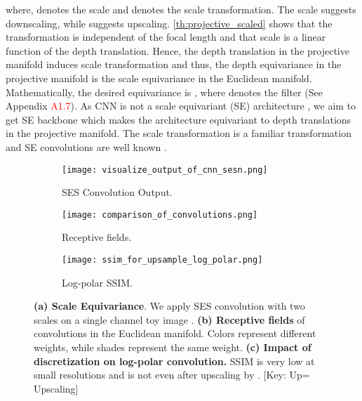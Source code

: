 \documentclass[runningheads]{llncs}
\newcommand{\equivariant} {equivariant}
\newcommand{\equivariance}{equivariance}
\newcommand{\Equivariance}{Equivariance}
\newcommand{\scaleEquivariant} {scale \equivariant}
\newcommand{\scaleEquivariance}{scale \equivariance}
\newcommand{\ScaleEquivariance}{Scale \Equivariance}
\newcommand{\ses}{SES}
\newcommand{\se}{SE}
\newcommand{\manifold}{manifold}
\newcommand{\transformation}{transformation}
\newcommand{\logPolar}{log-polar}
\newcommand{\LogPolar}{Log-polar}
\newcommand{\refSupApp}[1]{Appendix \textcolor{red}{A#1}}
\begin{document}
        where,  denotes the scale and  denotes the scale \transformation. 
        The scale  suggests downscaling, while  suggests upscaling.
        \cref{th:projective_scaled} shows that the \transformation{}   is independent of the focal length and that scale is a linear function of the depth translation.
        Hence, the depth translation in the projective \manifold{} induces scale \transformation{} and thus, the depth \equivariance{} in the projective manifold is the \scaleEquivariance{} in the Euclidean manifold. 
        Mathematically, the desired \equivariance{} is , where  denotes the filter (See \refSupApp{1.7}). As CNN is not a \scaleEquivariant{} (\se) architecture \cite{sosnovik2020sesn}, 
        we aim to get \se{} backbone which makes the architecture \equivariant{} to depth translations in the projective manifold.
        The scale transformation is a familiar \transformation{} and \se{} convolutions are well known \cite{ghosh2019scale, zhu2019scale, sosnovik2020sesn, jansson2021scale}.

        \begin{figure}[!tb]
            \centering
            \begin{subfigure}[align=bottom]{.31\linewidth}
                \centering
                \texttt{[image: visualize\_output\_of\_cnn\_sesn.png]}
                \caption{\ses{} Convolution Output.}
                \label{fig:scale_eq_toy}
            \end{subfigure}\hfill \begin{subfigure}[align=bottom]{.27\linewidth}
                \centering
                \texttt{[image: comparison\_of\_convolutions.png]}
                \caption{Receptive fields.}
                \label{fig:receptive}
            \end{subfigure}\hfill \begin{subfigure}[align=bottom]{.38\linewidth}
                \centering
                \texttt{[image: ssim\_for\_upsample\_log\_polar.png]}
                \caption{\LogPolar{} SSIM.}
                \label{fig:log_polar_ssim}
            \end{subfigure}
            \caption{ 
            \textbf{(a) \ScaleEquivariance}. We apply \ses{} convolution \cite{sosnovik2020sesn} with two scales on a single channel toy image . 
            \textbf{(b) Receptive fields} of convolutions in the Euclidean manifold. Colors represent different weights, while shades represent the same weight. 
            \textbf{(c) Impact of discretization on \logPolar{} convolution.} SSIM is very low at small resolutions and is not  even after upscaling by . 
            [Key: Up= Upscaling]
            }
        \end{figure}
\end{document}
